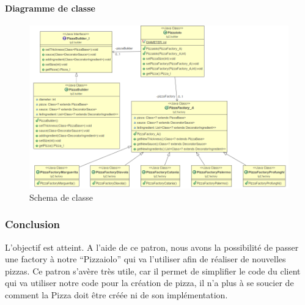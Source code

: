 \documentclass[french,]{article}
\let\oldparagraph\paragraph
\renewcommand{\paragraph}[1]{\oldparagraph{#1}\mbox{}}
\begin{document}
\paragraph{Diagramme de classe}\label{diagramme-de-classe}

\begin{figure}[htbp]
\centering
\includegraphics{factory.png}
\caption{Schema de classe}
\end{figure}


\subsubsection{Conclusion}\label{conclusion}

L'objectif est atteint. A l'aide de ce patron, nous avons la possibilité
de passer une factory à notre ``Pizzaiolo'' qui va l'utiliser afin de
réaliser de nouvelles pizzas. Ce patron s'avère très utile, car il
permet de simplifier le code du client qui va utiliser notre code pour
la création de pizza, il n'a plus à se soucier de comment la Pizza doit
être créée ni de son implémentation.
\end{document}
